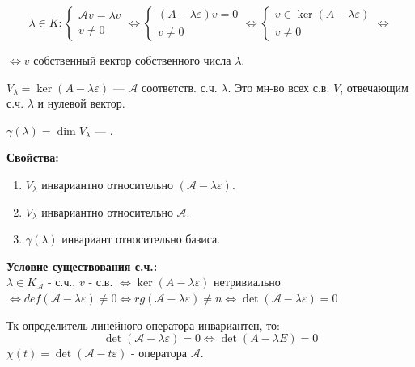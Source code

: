 $$\lambda \in K: \begin{cases}
    \mathcal{A} v =\lambda v\\
    v\neq 0
\end{cases} \Leftrightarrow \begin{cases}
    (A-\lambda \varepsilon)v = 0 \\
    v \neq 0
\end{cases} \Leftrightarrow\begin{cases}
    v \in \ker (A-\lambda\varepsilon)\\
    v\neq 0
\end{cases}\Leftrightarrow $$

$\Leftrightarrow v$ собственный вектор собственного числа  $\lambda$.

$V_{\lambda} = \ker(A-\lambda\varepsilon) $ %
---  $\mathcal{A}$ соответств. с.ч. $\lambda$. Это  {мн-во всех с.в. $V$, отвечающим с.ч. $\lambda$  и нулевой вектор}.

$\gamma(\lambda) = \dim V_{\lambda}$ --- .

\textbf{Свойства:}
\begin{enumerate}
    \item $V_{\lambda}$ инвариантно относительно $(\mathcal{A}-\lambda \varepsilon)$.
    \item $V_{\lambda}$ инвариантно относительно $\mathcal{A}$.
    \item $\gamma(\lambda)$ инвариант относительно базиса.
\end{enumerate}

\textbf{Условие существования с.ч.:} \\
$\lambda \in K_{\mathcal{A}}$ - с.ч., $v$ - с.в. $\Leftrightarrow \ker (A-\lambda\varepsilon)$ нетривиально $ \Leftrightarrow def(\mathcal{A} - \lambda\varepsilon) \ne 0 \Leftrightarrow rg(\mathcal{A} - \lambda\varepsilon) \ne n \Leftrightarrow \det(\mathcal{A} - \lambda \varepsilon) = 0$

Тк определитель линейного оператора  инвариантен, то:
$$\det(\mathcal{A} - \lambda \varepsilon) = 0 \Leftrightarrow \det({A} - \lambda E) = 0$$
 $\chi(t) = \det (\mathcal{A} - t\varepsilon)$ -  оператора $\mathcal{A}$.


